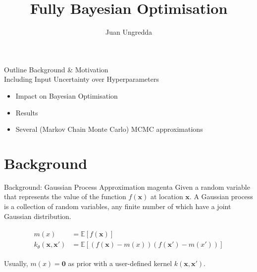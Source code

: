 \documentclass{beamer}
\title[]{Fully Bayesian Optimisation}
\author[Juan Ungredda]{\small Juan Ungredda}
\institute[]{University of Warwick}
\date{}
\begin{document}

\begin{frame}{Outline}
	Background \& Motivation\\
	\vspace{5mm}
	Including Input Uncertainty over Hyperparameters
	\begin{itemize}
		\item Impact on Bayesian Optimisation
		\item Results
		\item Several (Markov Chain Monte Carlo) MCMC approximations
	\end{itemize}
\end{frame}

\section{Background}

\begin{frame}{Background: Gaussian Process Approximation}
magenta
Given a random variable that represents the value of the function $f(\mathbf{x})$ at location $\mathbf{x}$. A Gaussian process is a collection of random variables, any finite number of which have a joint Gaussian distribution.

\begin{align*}
\begin{split}
m(x) &= \mathbb{E}[f(\mathbf{x})]\\
k_{\theta}(\mathbf{x},\mathbf{x}') &=\mathbb{E}[(f(\mathbf{x}) - m(x))(f(\mathbf{x'}) - m(x'))]
\end{split}
\end{align*}

Usually, $m(x) = \mathbf{0}$ as prior with a user-defined kernel $k(\mathbf{x},\mathbf{x}')$.
\end{frame}
\end{document}
